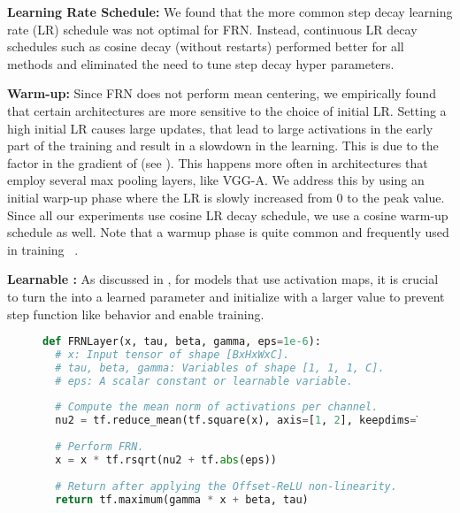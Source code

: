 \documentclass[10pt,twocolumn,letterpaper]{article}
\newcommand{\papername}{FRN}
\begin{document}
\medskip
\noindent
\textbf{Learning Rate Schedule:} We found that the more common step decay learning rate (LR) schedule was not optimal for FRN. Instead, continuous LR decay schedules such as cosine decay (without restarts) performed better for all methods and eliminated the need to tune step decay hyper parameters. 

\medskip
\noindent
\textbf{Warm-up:}
Since \papername{} does not perform mean centering, we empirically found that certain architectures are more sensitive to the choice of initial LR. Setting a high initial LR causes large updates, that lead to large activations in the early part of the training and result in a slowdown in the learning. This is due to the  factor in the gradient of  (see ). This happens more often in architectures that employ several max pooling layers, like VGG-A. We address this by using an initial warp-up phase where the LR is slowly increased from 0 to the peak value. Since all our experiments use cosine LR decay schedule, we use a cosine warm-up schedule as well. Note that a warmup phase is quite common and  frequently used in training ~\cite{resnets, resnetsv2,Imagenet2017}.

\medskip
\noindent
\textbf{Learnable :}
As discussed in , for models that use  activation maps, it is crucial to turn the  into a learned parameter and initialize with a larger value to prevent step function like behavior and enable training.

\begin{figure}[t]
\vspace{-1mm}
\begin{lstlisting}[language=Python,caption=Tensorflow implementation of \papername{} layer,label=lst:implementation]
def FRNLayer(x, tau, beta, gamma, eps=1e-6):
  # x: Input tensor of shape [BxHxWxC].
  # tau, beta, gamma: Variables of shape [1, 1, 1, C].
  # eps: A scalar constant or learnable variable.
  
  # Compute the mean norm of activations per channel.
  nu2 = tf.reduce_mean(tf.square(x), axis=[1, 2], keepdims=True)
  
  # Perform FRN.
  x = x * tf.rsqrt(nu2 + tf.abs(eps))
  
  # Return after applying the Offset-ReLU non-linearity.
  return tf.maximum(gamma * x + beta, tau)
\end{lstlisting}
\vspace{-0.5cm}
\end{figure}
\end{document}
